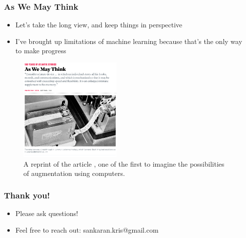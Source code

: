 \documentclass[10pt,mathserif]{beamer}
\begin{document}
\begin{frame}
  \frametitle{As We May Think}
\begin{itemize}
\item Let's take the long view, and keep things in perspective
\item I've brought up limitations of machine learning because that's the only
  way to make progress
\end{itemize}
\begin{figure}[ht]
  \centering
  \includegraphics[width=0.45\textwidth]{figures/as_we_may_think}
  \caption{A reprint of the article \citep{bush1945we}, one of the first to
    imagine the possibilities of augmentation using computers. \label{fig:label}
  }
\end{figure}


\end{frame}

\begin{frame}
  \frametitle{Thank you!}
  \begin{itemize}
  \item Please ask questions!
  \item Feel free to reach out: sankaran.kris@gmail.com
  \end{itemize}
\end{frame}

\begin{frame}[allowframebreaks]
  
  
\end{frame}
\end{document}
